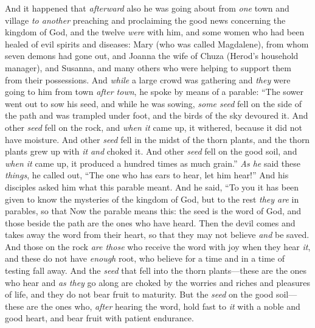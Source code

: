 \begin{biblechapter} %
 And it happened that \textit{afterward} also he was going about from \textit{one} town and village \textit{to another} preaching and proclaiming the good news concerning the kingdom of God, and the twelve \textit{were} with him,
\verse and some women who had been healed of evil spirits and diseases: Mary (who was called Magdalene), from whom seven demons had gone out,
\verse and Joanna the wife of Chuza (Herod’s household manager), and Susanna, and many others who were helping to support them from their possessions.
 And \textit{while} a large crowd was gathering and \textit{they} were going to him from town \textit{after town}, he spoke by means of a parable:
\verse “The sower went out to sow his seed, and while he was sowing, \textit{some seed} fell on the side of the path and was trampled under foot, and the birds of the sky devoured it.
\verse And other \textit{seed} fell on the rock, and \textit{when it} came up, it withered, because it did not have moisture.
\verse And other \textit{seed} fell in the midst of the thorn plants, and the thorn plants grew up with \textit{it} \textit{and} choked it.
\verse And other \textit{seed} fell on the good soil, and \textit{when it} came up, it produced a hundred times as much grain.” \textit{As he} said these \textit{things}, he called out, “The one who has ears to hear, let him hear!”
 And his disciples asked him what this parable meant.
\verse And he said, “To you it has been given to know the mysteries of the kingdom of God, but to the rest \textit{they are} in parables, so that
 Now the parable means this: the seed is the word of God,
\verse and those beside the path are the ones who have heard. Then the devil comes and takes away the word from their heart, so that they may not believe \textit{and} be saved.
\verse And those on the rock \textit{are those} who receive the word with joy when they hear \textit{it}, and these do not have \textit{enough} root, who believe for a time and in a time of testing fall away.
\verse And the \textit{seed} that fell into the thorn plants—these are the ones who hear and \textit{as they} go along are choked by the worries and riches and pleasures of life, and they do not bear fruit to maturity.
\verse But the \textit{seed} on the good soil—these are the ones who, \textit{after} hearing the word, hold fast to \textit{it} with a noble and good heart, and bear fruit with patient endurance.

\end{biblechapter}
